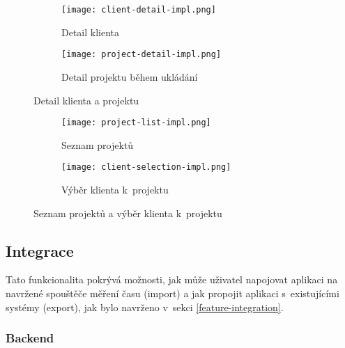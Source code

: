 \begin{figure}[p]
    \centering
    \begin{subfigure}[b]{0.4\textwidth}
		\centering
		\texttt{[image: client-detail-impl.png]}
		\caption{Detail klienta}
		\label{fig:client-detail-impl}
	\end{subfigure}
	\hspace{2cm}
	\begin{subfigure}[b]{0.4\textwidth}
		\centering
		\texttt{[image: project-detail-impl.png]}
		\caption{Detail projektu během ukládání}
		\label{fig:project-detail-impl}
	\end{subfigure}
	\caption{Detail klienta a projektu}
	\label{fig:client-projet-detail-impl}
\end{figure}

\begin{figure}[p]
    \centering
    \begin{subfigure}[b]{0.4\textwidth}
		\centering
		\texttt{[image: project-list-impl.png]}
		\caption{Seznam projektů}
		\label{fig:project-list-impl}
	\end{subfigure}
	\hspace{2cm}
	\begin{subfigure}[b]{0.4\textwidth}
		\centering
		\texttt{[image: client-selection-impl.png]}
		\caption{Výběr klienta k~projektu}
		\label{fig:client-selection-impl}
	\end{subfigure}
	\caption{Seznam projektů a výběr klienta k~projektu}
	\label{fig:project-list-client-selection-impl}
\end{figure}

\subsection{Integrace}

Tato funkcionalita pokrývá možnosti, jak může uživatel napojovat aplikaci na navržené spouštěče měření času (import) a jak propojit aplikaci s~existujícími systémy (export), jak bylo navrženo v~sekci \ref{feature-integration}.

\subsubsection{Backend}

